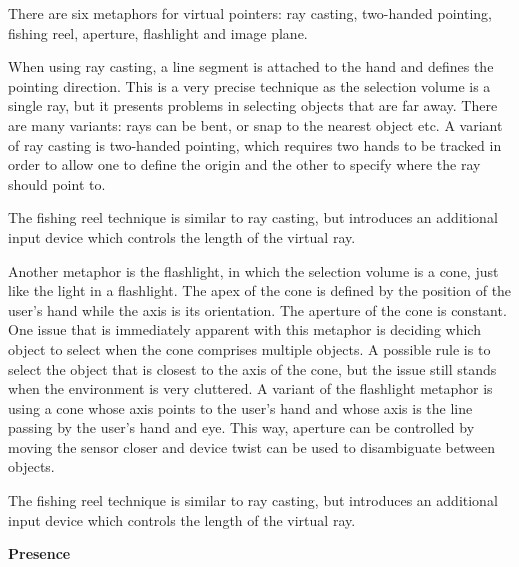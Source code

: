 \documentclass[answers, a4paper, 11pt]{exam}
\begin{document}
\begin{questions}
\begin{parts}
\begin{solution}
			There are six metaphors for virtual pointers: ray casting, two-handed pointing, fishing reel, aperture, flashlight and image plane.

			When using ray casting, a line segment is attached to the hand and defines the pointing direction.
			This is a very precise technique as the selection volume is a single ray, but it presents problems in selecting objects that are far away.
			There are many variants: rays can be bent, or snap to the nearest object etc.
			A variant of ray casting is two-handed pointing, which requires two hands to be tracked in order to allow one to define the origin and the other to specify where the ray should point to.

			The fishing reel technique is similar to ray casting, but introduces an additional input device which controls the length of the virtual ray.

			Another metaphor is the flashlight, in which the selection volume is a cone, just like the light in a flashlight.
			The apex of the cone is defined by the position of the user's hand while the axis is its orientation.
			The aperture of the cone is constant.
			One issue that is immediately apparent with this metaphor is deciding which object to select when the cone comprises multiple objects.
			A possible rule is to select the object that is closest to the axis of the cone, but the issue still stands when the environment is very cluttered.
			A variant of the flashlight metaphor is using a cone whose axis points to the user's hand and whose axis is the line passing by the user's hand and eye.
			This way, aperture can be controlled by moving the sensor closer and device twist can be used to disambiguate between objects.

			The fishing reel technique is similar to ray casting, but introduces an additional input device which controls the length of the virtual ray.



		\end{solution}
	\end{parts}
	\question \textbf{Presence}
	\begin{parts}

\end{parts}
\end{questions}
\end{document}

